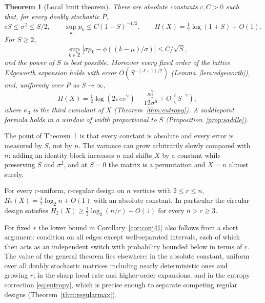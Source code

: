 \documentclass[11pt,a4paper]{article}
\newtheorem{mainthm}{Theorem}\renewcommand{\themainthm}{\Alph{mainthm}}
\theoremstyle{definition}\newtheorem{remark}[theorem]{Remark}\newtheorem{conjecture}{Conjecture}
\begin{document}
\begin{mainthm}[Local limit theorem]\label{thm:C}
There are absolute constants $c,C>0$ such that, for every doubly stochastic $P$,
\begin{equation}
 cS\le \sigma^2\le S/2,\qquad
 \sup_k p_k\le C(1+S)^{-1/2},\qquad
 H(X)=\tfrac12\log(1+S)+O(1).\label{eq:finite}
\end{equation}
For $S\ge 2$,
\begin{equation}
 \sup_{k\in\mathbb Z}\left|\sigma p_k-\phi((k-\mu)/\sigma)\right|
 \le C/\sqrt S,\label{eq:local}
\end{equation}
and the power of $S$ is best possible. Moreover every fixed order of the lattice Edgeworth expansion holds with error $O(S^{-(J+1)/2})$ (Lemma~\ref{lem:edgeworth}), and, uniformly over $P$ as $S\to\infty$,
\begin{equation}
 H(X)=\tfrac12\log(2\pi e\sigma^2)-\frac{\kappa_3^2}{12\sigma^6}+O(S^{-2}),
 \label{eq:entropy}
\end{equation}
where $\kappa_3$ is the third cumulant of $X$ (Theorem~\ref{thm:entropy}). A saddlepoint formula holds in a window of width proportional to $S$ (Proposition~\ref{prop:saddle}).
\end{mainthm}

The point of Theorem~\ref{thm:C} is that every constant is absolute and every error is measured by $S$, not by $n$. The variance can grow arbitrarily slowly compared with $n$: adding an identity block increases $n$ and shifts $X$ by a constant while preserving $S$ and $\sigma^2$, and at $S=0$ the matrix is a permutation and $X=n$ almost surely.

\begin{corollary}\label{cor:conj41}
For every $r$-uniform, $r$-regular design on $n$ vertices with $2\le r\le n$, $H_2(X)=\tfrac12\log_2 n+O(1)$ with an absolute constant. In particular the circular design satisfies $H_2(X)\ge\tfrac12\log_2(n/r)-O(1)$ for every $n>r\ge3$.
\end{corollary}

For fixed $r$ the lower bound in Corollary~\ref{cor:conj41} also follows from a short argument: condition on all edges except well-separated intervals, each of which then acts as an independent switch with probability bounded below in terms of $r$. The value of the general theorem lies elsewhere: in the absolute constant, uniform over all doubly stochastic matrices including nearly deterministic ones and growing $r$; in the sharp local rate and higher-order expansions; and in the entropy correction \eqref{eq:entropy}, which is precise enough to separate competing regular designs (Theorem~\ref{thm:regularmax}).
\end{document}
